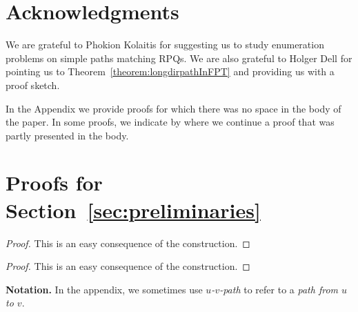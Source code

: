 \documentclass[a4paper,english]{lipics-v2016}
\theoremstyle{plain}
\begin{document}
 

\section*{Acknowledgments}

We are grateful to Phokion Kolaitis for suggesting us to study 
enumeration problems on simple paths matching RPQs. We
are also grateful to Holger Dell for pointing us to
Theorem~\ref{theorem:longdirpathInFPT} and providing us with a proof sketch.





\onecolumn
\newpage

\appendix
In the Appendix we provide proofs for which there was no space in the
body of the paper. In some proofs, we indicate by \fbox{$\cdots$}
where we continue a proof that was partly presented in the body.

\makeatletter{}\section{Proofs for Section~\ref{sec:preliminaries}}



\splitgraphlemma*
\begin{proof}
  This is an easy consequence of the construction.
  \end{proof}


\linegraphlemma*
\begin{proof}
  This is an easy consequence of the construction.
  \end{proof}

 
\makeatletter{}







 
 
 
 
 
 






\noindent \textbf{Notation.} In the appendix, we sometimes use
\emph{$u$-$v$-path} to refer to a \emph{path from $u$ to $v$}.
\end{document}
